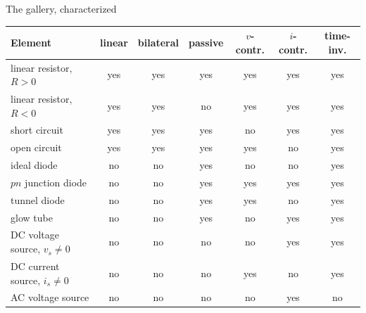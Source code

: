 \documentclass[11pt,aspectratio=169]{beamer}
\begin{document}
\begin{frame}{The gallery, characterized}
  \vfill
  \begin{center}
  \footnotesize
  \renewcommand{\arraystretch}{1.18}
  \begin{tabular}{@{}l c c c c c c@{}}
    \toprule
    \textbf{Element} & linear & bilateral & passive & $v$-contr. & $i$-contr. & time-inv.\\
    \midrule
    linear resistor, $R>0$        & yes & yes & yes & yes & yes & yes\\
    linear resistor, $R<0$        & yes & yes & \alert{no}  & yes & yes & yes\\
    short circuit                 & yes & yes & yes & \alert{no}  & yes & yes\\
    open circuit                  & yes & yes & yes & yes & \alert{no}  & yes\\
    ideal diode                   & \alert{no} & \alert{no} & yes & \alert{no} & \alert{no} & yes\\
    $pn$ junction diode           & \alert{no} & \alert{no} & yes & yes & yes & yes\\
    tunnel diode                  & \alert{no} & \alert{no} & yes & yes & \alert{no} & yes\\
    glow tube                     & \alert{no} & \alert{no} & yes & \alert{no} & yes & yes\\
    DC voltage source, $v_s\neq0$ & \alert{no} & \alert{no} & \alert{no} & \alert{no} & yes & yes\\
    DC current source, $i_s\neq0$ & \alert{no} & \alert{no} & \alert{no} & yes & \alert{no} & yes\\
    AC voltage source             & \alert{no} & \alert{no} & \alert{no} & \alert{no} & yes & \alert{no}\\
    \bottomrule
  \end{tabular}
  \end{center}
  \vfill
\end{frame}
\end{document}
